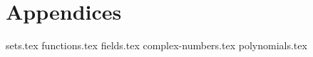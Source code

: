 \chapter{Appendices}
{sets.tex}
{functions.tex}
{fields.tex}
{complex-numbers.tex}
{polynomials.tex}